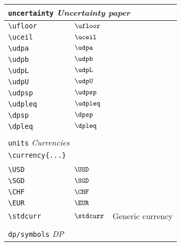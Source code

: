 \begin{longtable}{lll}
 \multicolumn{3}{l}{{\color[rgb]{0.5,0.5,0.5}\texttt{uncertainty}} \emph{Uncertainty paper}}\\ 
 \hline
\hline
{\color[rgb]{0.5,0.5,0.5}\texttt{\textbackslash ufloor}} & $\ufloor$ & \\ 
 {\color[rgb]{0.5,0.5,0.5}\texttt{\textbackslash uceil}} & $\uceil$ & \\ 
 {\color[rgb]{0.5,0.5,0.5}\texttt{\textbackslash udpa}} & $\udpa$ & \\ 
 {\color[rgb]{0.5,0.5,0.5}\texttt{\textbackslash udpb}} & $\udpb$ & \\ 
 {\color[rgb]{0.5,0.5,0.5}\texttt{\textbackslash udpL}} & $\udpL$ & \\ 
 {\color[rgb]{0.5,0.5,0.5}\texttt{\textbackslash udpU}} & $\udpU$ & \\ 
 {\color[rgb]{0.5,0.5,0.5}\texttt{\textbackslash udpsp}} & $\udpsp$ & \\ 
 {\color[rgb]{0.5,0.5,0.5}\texttt{\textbackslash udpleq}} & $\udpleq$ & \\ 
 {\color[rgb]{0.5,0.5,0.5}\texttt{\textbackslash dpsp}} & $\dpsp$ & \\ 
 {\color[rgb]{0.5,0.5,0.5}\texttt{\textbackslash dpleq}} & $\dpleq$ & \\ 
  &  & \\ 
 \multicolumn{3}{l}{{\color[rgb]{0.5,0.5,0.5}\texttt{units}} \emph{Currencies}}\\ 
 \hline
\hline
{\color[rgb]{0.5,0.5,0.5}\texttt{\textbackslash currency\{...\}}} &  & \\ 
  &  & {\setlength\fboxsep{1pt}%
\fbox{%
\color[rgb]{0.5,0.5,0.5}\begin{minipage}[]{5cm}%
$\currency{a}$\par%
{\footnotesize{\texttt{\$\textbackslash currency\{a\}\$}}}\end{minipage}%
}%
}%
\\ 
 {\color[rgb]{0.5,0.5,0.5}\texttt{\textbackslash USD}} & $\USD$ & \\ 
 {\color[rgb]{0.5,0.5,0.5}\texttt{\textbackslash SGD}} & $\SGD$ & \\ 
 {\color[rgb]{0.5,0.5,0.5}\texttt{\textbackslash CHF}} & $\CHF$ & \\ 
 {\color[rgb]{0.5,0.5,0.5}\texttt{\textbackslash EUR}} & $\EUR$ & \\ 
 {\color[rgb]{0.5,0.5,0.5}\texttt{\textbackslash stdcurr}} & $\stdcurr$ &  Generic currency\\ 
  &  & \\ 
 \multicolumn{3}{l}{{\color[rgb]{0.5,0.5,0.5}\texttt{dp/symbols}} \emph{DP}}\\ 

\end{longtable}
